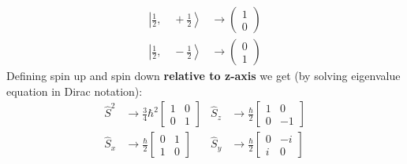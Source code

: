 \begin{align*}
    \left|\frac{1}{2},\quad +\frac{1}{2}\right> & \rightarrow \left(\begin{matrix}
                                                                            1 \\
                                                                            0
                                                                        \end{matrix}\right) \\
    \left|\frac{1}{2},\quad -\frac{1}{2}\right> & \rightarrow \left(\begin{matrix}
                                                                            0 \\
                                                                            1
                                                                        \end{matrix}\right)
\end{align*}
Defining spin up and spin down \textbf{relative to z-axis} we get (by solving eigenvalue equation in Dirac notation):
\begin{align*}
    \widehat{S}^2   & \rightarrow \frac{3}{4}{\hbar}^2\begin{bmatrix}
                                                          1 & 0 \\
                                                          0 & 1
                                                      \end{bmatrix} &
    \widehat{S}_{z} & \rightarrow \frac{\hbar}{2}\begin{bmatrix}
                                                     1 & 0  \\
                                                     0 & -1
                                                 \end{bmatrix}       \\
    \widehat{S}_{x} & \rightarrow \frac{\hbar}{2}\begin{bmatrix}
                                                     0 & 1 \\
                                                     1 & 0
                                                 \end{bmatrix}      &
    \widehat{S}_{y} & \rightarrow \frac{\hbar}{2}\begin{bmatrix}
                                                     0 & -i \\
                                                     i & 0
                                                 \end{bmatrix}
\end{align*}

